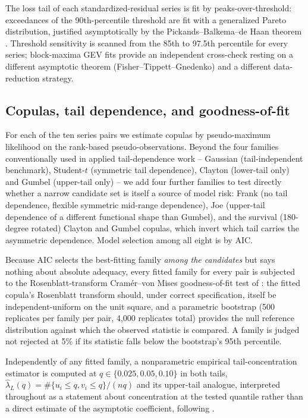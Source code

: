 \documentclass[final,3p,times,authoryear]{elsarticle}
\begin{document}
The loss tail of each standardized-residual series is fit by
peaks-over-threshold: exceedances of the 90th-percentile threshold are
fit with a generalized Pareto distribution, justified asymptotically by
the Pickands--Balkema--de Haan theorem \citep{balkema1974,pickands1975}.
Threshold sensitivity is scanned from the 85th to 97.5th percentile for
every series; block-maxima GEV fits provide an independent cross-check
resting on a different asymptotic theorem (Fisher--Tippett--Gnedenko)
and a different data-reduction strategy.

\subsection{Copulas, tail dependence, and goodness-of-fit}
\label{sec:copula-method}

For each of the ten series pairs we estimate copulas by pseudo-maximum
likelihood on the rank-based pseudo-observations. Beyond the four
families conventionally used in applied tail-dependence work --
Gaussian (tail-independent benchmark), Student-$t$ (symmetric tail
dependence), Clayton (lower-tail only) and Gumbel (upper-tail only) --
we add four further families to test directly whether a narrow
candidate set is itself a source of model risk: Frank (no tail
dependence, flexible symmetric mid-range dependence), Joe (upper-tail
dependence of a different functional shape than Gumbel), and the
survival (180-degree rotated) Clayton and Gumbel copulas, which invert
which tail carries the asymmetric dependence. Model selection among all
eight is by AIC.

Because AIC selects the best-fitting family \emph{among the candidates}
but says nothing about absolute adequacy, every fitted family for every
pair is subjected to the Rosenblatt-transform Cram\'er--von Mises
goodness-of-fit test of \citet{genest2009}: the fitted copula's
Rosenblatt transform should, under correct specification, itself be
independent-uniform on the unit square, and a parametric bootstrap (500
replicates per family per pair, 4,000 replicates total) provides the
null reference distribution against which the observed statistic is
compared. A family is judged not rejected at 5\% if its statistic falls
below the bootstrap's 95th percentile.

Independently of any fitted family, a nonparametric empirical
tail-concentration estimator is computed at $q \in \{0.025, 0.05,
0.10\}$ in both tails,
$\hat\lambda_L(q) = \#\{u_i \le q, v_i \le q\}/(nq)$ and its upper-tail
analogue, interpreted throughout as a statement about concentration at
the tested quantile rather than a direct estimate of the asymptotic
coefficient, following \citet{hua2011}.
\end{document}
